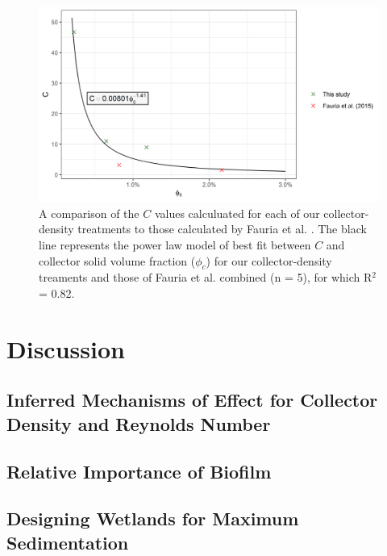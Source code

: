 \documentclass[geosciences,article,submit,moreauthors,pdftex]{Definitions/mdpi}
\begin{document}
\begin{figure}[H]
\centering
\includegraphics[width=5in]{../pics/cphiplot.png}
\caption{A comparison of the $C$ values calculuated for each of our collector-density treatments to those calculated by Fauria et al. \cite{Fauria_2015}. The black line represents the power law model of best fit between $C$ and collector solid volume fraction ($\phi_c$) for our collector-density treaments and those of Fauria et al. combined (n = 5), for which R$^2$ = 0.82.}
\label{fig:cphi}
\end{figure}   

\section{Discussion}

\subsection{Inferred Mechanisms of Effect for Collector Density and Reynolds Number}

\subsection{Relative Importance of Biofilm}

\subsection{Designing Wetlands for Maximum Sedimentation}

\vspace{6pt} 

\end{document}
